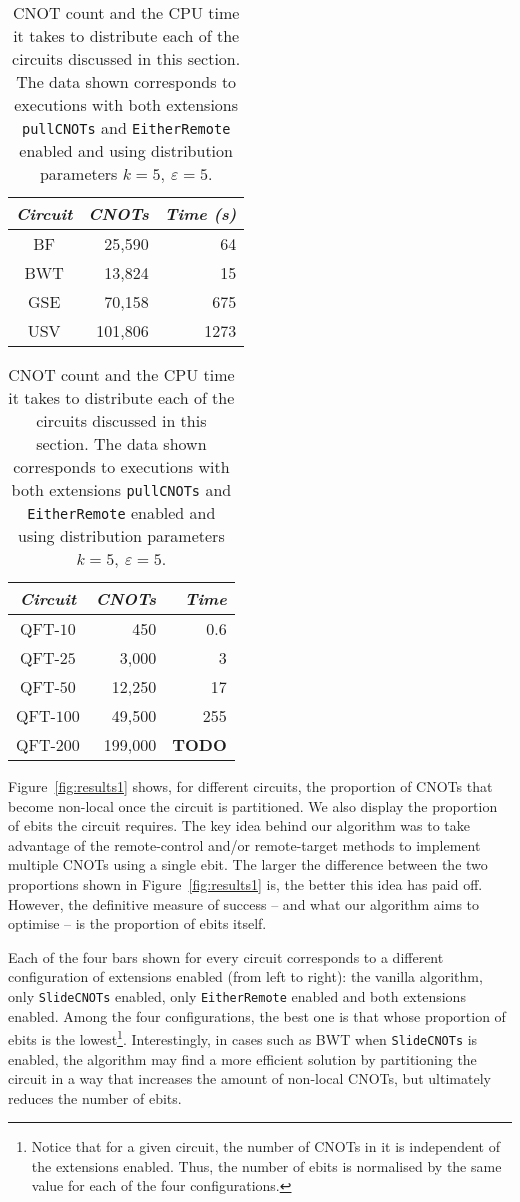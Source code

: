 \begin{table}
\caption{CNOT count and the CPU time it takes to distribute each of the circuits discussed in this section. The data shown corresponds to executions with both extensions \texttt{pullCNOTs} and \texttt{EitherRemote} enabled and using distribution parameters \(k\!=\!5,\ \varepsilon\!=\!5\).}
\label{tab:time}
\centering
\vspace*{3mm}
\begin{tabular}{|c|r|r|}
\hline
\textit{Circuit} & \textit{CNOTs} & \textit{Time (s)} \\
\hline
{\small BF} & 25,590 & 64 \\
{\small BWT} & 13,824 & 15 \\
{\small GSE} & 70,158 & 675 \\
{\small USV} & 101,806 & 1273\\
\hline
\end{tabular}
\hspace{10mm}
\begin{tabular}{|c|r|r|}
\hline
\textit{Circuit} & \textit{CNOTs} & \textit{Time} \\
\hline
{\small QFT-\(10\)} & 450 & 0.6 \\
{\small QFT-\(25\)} & 3,000 & 3 \\
{\small QFT-\(50\)} & 12,250 & 17 \\
{\small QFT-\(100\)} & 49,500 & 255 \\
{\small QFT-\(200\)} & 199,000 & \textbf{TODO}\\
\hline
\end{tabular}
\end{table}

Figure~\ref{fig:results1} shows, for different circuits, the proportion of CNOTs that become non-local once the circuit is partitioned. We also display the proportion of ebits the circuit requires. The key idea behind our algorithm was to take advantage of the remote-control and/or remote-target methods to implement multiple CNOTs using a single ebit. The larger the difference between the two proportions shown in Figure~\ref{fig:results1} is, the better this idea has paid off. However, the definitive measure of success -- and what our algorithm aims to optimise -- is the proportion of ebits itself. 



Each of the four bars shown for every circuit corresponds to a different configuration of extensions enabled (from left to right): the vanilla algorithm, only \texttt{SlideCNOTs} enabled, only \texttt{EitherRemote} enabled and both extensions enabled. Among the four configurations, the best one is that whose proportion of ebits is the lowest\footnote{Notice that for a given circuit, the number of CNOTs in it is independent of the extensions enabled. Thus, the number of ebits is normalised by the same value for each of the four configurations.}. Interestingly, in cases such as BWT when \texttt{SlideCNOTs} is enabled, the algorithm may find a more efficient solution by partitioning the circuit in a way that increases the amount of non-local CNOTs, but ultimately reduces the number of ebits.

